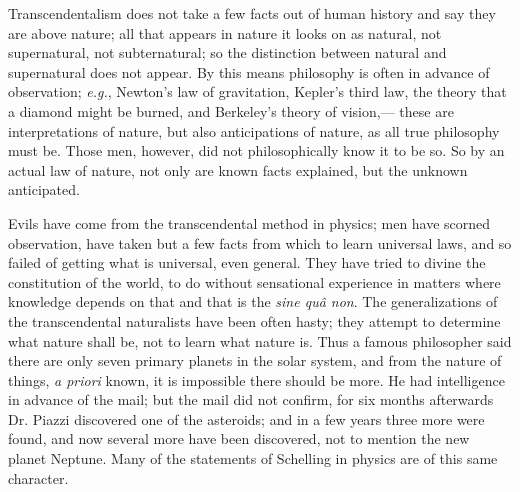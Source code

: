 \documentclass[12pt]{article}
\begin{document}
Transcendentalism does not take a few facts out of human history and say they are above nature; all that appears in nature it looks on as natural, not supernatural, not subternatural; so the distinction between natural and supernatural does not appear. By this means philosophy is often in advance of observation; \emph{e.g.}, Newton's law of gravitation, Kepler's third law, the theory that a diamond might be burned, and Berkeley's theory of vision,--- these are interpretations of nature, but also anticipations of nature, as all true philosophy must be. Those men, however, did not philosophically know it to be so. So by an actual law of nature, not only are known facts explained, but the unknown anticipated. 

Evils have come from the transcendental method in physics; men have scorned observation, have taken but a few facts from which to learn universal laws, and so failed of getting what is universal, even general. They have tried to divine the constitution of the world, to do without sensational experience in matters where knowledge depends on that and that is the \emph{sine qu\^{a} non}. The generalizations of the transcendental naturalists have been often hasty; they attempt to determine what nature shall be, not to learn what nature is. Thus a famous philosopher said there are only seven primary planets in the solar system, and from the nature of things, \emph{a priori} known, it is impossible there should be more. He had intelligence in advance of the mail; but the mail did not confirm, for six months afterwards Dr. Piazzi discovered one of the asteroids; and in a few years three more were found, and now several more have been discovered, not to mention the new planet Neptune. Many of the statements of Schelling in physics are of this same character. 
\end{document}
